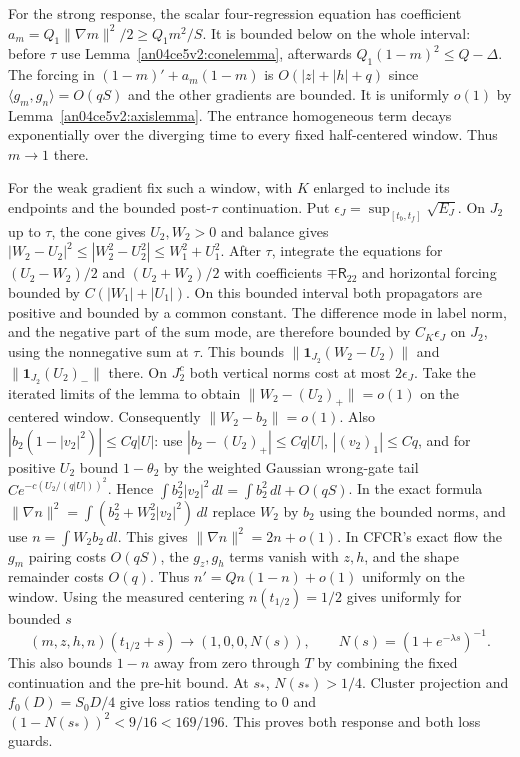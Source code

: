 \documentclass[11pt]{article}
\newcommand{\dd}{\,dl}
\begin{document}
For the strong response, the scalar four-regression equation has coefficient $a_m=Q_1\|\nabla m\|^2/2\ge Q_1m^2/S$. It is bounded below on the whole interval: before $\tau$ use Lemma~\ref{an04ce5v2:conelemma}, afterwards $Q_1(1-m)^2\le Q-\Delta$. The forcing in $(1-m)'+a_m(1-m)$ is $O(|z|+|h|+q)$ since $\langle g_m,g_n\rangle=O(qS)$ and the other gradients are bounded. It is uniformly $o(1)$ by Lemma~\ref{an04ce5v2:axislemma}. The entrance homogeneous term decays exponentially over the diverging time to every fixed half-centered window. Thus $m\to1$ there.

For the weak gradient fix such a window, with $K$ enlarged to include its endpoints and the bounded post-$\tau$ continuation. Put $\epsilon_J=\sup_{[t_b,t_f]}\sqrt{E_J}$. On $J_2$ up to $\tau$, the cone gives $U_2,W_2>0$ and balance gives
$|W_2-U_2|^2\le |W_2^2-U_2^2|\le W_1^2+U_1^2$.
After $\tau$, integrate the equations for $(U_2-W_2)/2$ and $(U_2+W_2)/2$ with coefficients $\mp\mathsf R_{22}$ and horizontal forcing bounded by $C(|W_1|+|U_1|)$. On this bounded interval both propagators are positive and bounded by a common constant. The difference mode in label norm, and the negative part of the sum mode, are therefore bounded by $C_K\epsilon_J$ on $J_2$, using the nonnegative sum at $\tau$. This bounds $\|\mathbf1_{J_2}(W_2-U_2)\|$ and $\|\mathbf1_{J_2}(U_2)_-\|$ there. On $J_2^c$ both vertical norms cost at most $2\epsilon_J$. Take the iterated limits of the lemma to obtain $\|W_2-(U_2)_+\|=o(1)$ on the centered window. Consequently $\|W_2-b_2\|=o(1)$. Also $|b_2(1-|v_2|^2)|\le Cq|U|$: use $|b_2-(U_2)_+|\le Cq|U|$, $|(v_2)_1|\le Cq$, and for positive $U_2$ bound $1-\theta_2$ by the weighted Gaussian wrong-gate tail $Ce^{-c(U_2/(q|U|))^2}$. Hence
$\int b_2^2|v_2|^2\dd=\int b_2^2\dd+O(qS)$. In the exact formula
$\|\nabla n\|^2=\int(b_2^2+W_2^2|v_2|^2)\dd$ replace $W_2$ by $b_2$ using the bounded norms, and use $n=\int W_2 b_2\dd$. This gives $\|\nabla n\|^2=2n+o(1)$. In CFCR's exact flow the $g_m$ pairing costs $O(qS)$, the $g_z,g_h$ terms vanish with $z,h$, and the shape remainder costs $O(q)$. Thus $n'=Q n(1-n)+o(1)$ uniformly on the window. Using the measured centering $n(t_{1/2})=1/2$ gives uniformly for bounded $s$
\begin{equation}\label{an04ce5v2:logistic}
 (m,z,h,n)(t_{1/2}+s)\longrightarrow(1,0,0,N(s)),\qquad
 N(s)=(1+e^{-\lambda s})^{-1}.
\end{equation}
This also bounds $1-n$ away from zero through $T$ by combining the fixed continuation and the pre-hit bound. At $s_*$, $N(s_*)>1/4$. Cluster projection and $f_0(D)=S_0D/4$ give loss ratios tending to $0$ and $(1-N(s_*))^2<9/16<169/196$. This proves both response and both loss guards.
\end{document}
